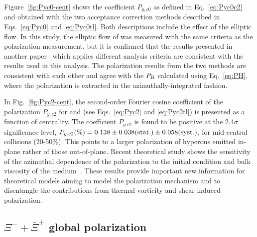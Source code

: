 \documentclass[preprint,5p,times,twocolumn]{elsarticle}
\begin{document}
Figure~\ref{fig:Pyc0-cent} shows the coefficient $P_{y,c0}$ as defined in Eq.~\eqref{eq:Pyc0c2} and obtained with the two acceptance correction methods described in Eqs.~\eqref{eq:Pyc0} and \eqref{eq:Pyc0tl}. 
Both descriptions include the effect of the elliptic flow. 
In this study, the elliptic flow of \lam was measured with the same criteria as the polarization measurement, but it is confirmed that the results presented in another paper~\cite{strangev2} which applies different analysis criteria are consistent with the results used in this analysis.
%
%
The polarization results from the two methods are consistent with each other and agree with the $P_{\rm H}$ calculated using Eq.~\eqref{eq:PH}, where the polarization is extracted in the azimuthally-integrated fashion.

In Fig.~\ref{fig:Pyc2-cent}, the second-order Fourier cosine coefficient of the polarization $P_{y,c2}$ for \lam and \alam (see Eqs.~\eqref{eq:Pyc2} and \eqref{eq:Pyc2tl}) is presented as a function of centrality. 
The coefficient $P_{y.c2}$ is found to be positive at the 2.4$\sigma$ significance level, $P_{y.c2} (\%) = 0.138\pm0.038({\rm stat.})\pm0.058({\rm syst.})$, for mid-central collisions (20-50\%). 
This points to a larger polarization of hyperons emitted in-plane rather of those out-of-plane. 
Recent theoretical study shows the sensitivity of the azimuthal dependence of the polarization to the initial condition and bulk viscosity of the medium~\cite{Palermo:2024tza}. 
These results provide important new information for theoretical models aiming to model the polarization mechanism and to disentangle the contributions from thermal vorticity and shear-induced polarization.



\subsection{$\Xi^{-}+\bar\Xi^{+}$ global polarization}
\end{document}
